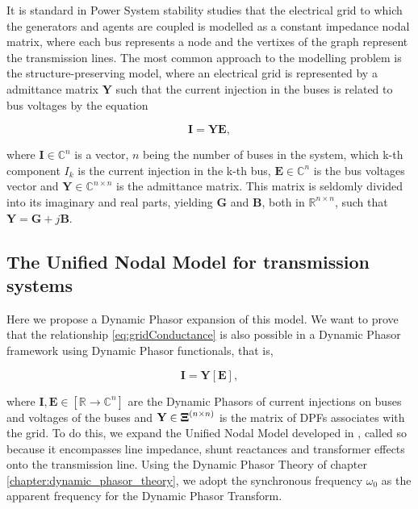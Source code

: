 	It is standard in Power System stability studies that the electrical grid to which the generators and agents are coupled is modelled as a constant impedance nodal matrix, where each bus represents a node and the vertixes of the graph represent the transmission lines. The most common approach to the modelling problem is the structure-preserving model, where an electrical grid is represented by a admittance matrix $\mathbf{Y}$ such that the current injection in the buses is related to bus voltages by the equation

\begin{equation} \mathbf{I} = \mathbf{Y}\mathbf{E}, \label{eq:gridConductance} \end{equation}

	\noindent where $\mathbf{I}\in \mathbb{C}^{n}$ is a vector, $n$ being the number of buses in the system, which k-th component $I_k$ is the current injection in the k-th bus, $\mathbf{E}\in \mathbb{C}^{n}$ is the bus voltages vector and $\mathbf{Y}\in\mathbb{C}^{n\times n}$ is the admittance matrix. This matrix is seldomly divided into its imaginary and real parts, yielding $\mathbf{G}$ and $\mathbf{B}$, both in $\mathbb{R}^{n\times n}$, such that $\mathbf{Y} = \mathbf{G} + j\mathbf{B}$.

\subsection{The Unified Nodal Model for transmission systems}\label{subsec:unified_model} %

	Here we propose a Dynamic Phasor expansion of this model. We want to prove that the relationship \eqref{eq:gridConductance} is also possible in a Dynamic Phasor framework using Dynamic Phasor functionals, that is,

\begin{equation} \mathbf{I} = \mathbf{Y}\left[\mathbf{E}\right], \label{eq:gridConductance_dynamic}\end{equation}

	\noindent where $\mathbf{I,E}\in\left[\mathbb{R}\to\mathbb{C}^n\right]$ are the Dynamic Phasors of current injections on buses and voltages of the buses and $\mathbf{Y}\in\boldsymbol{\Xi}^{(n\times n)}$ is the matrix of DPFs associates with the grid. To do this, we expand the Unified Nodal Model developed in \cite{Monticelli1999}, called so because it encompasses line impedance, shunt reactances and transformer effects onto the transmission line. Using the Dynamic Phasor Theory of chapter \ref{chapter:dynamic_phasor_theory}, we adopt the synchronous frequency $\omega_0$ as the apparent frequency for the Dynamic Phasor Transform. 

